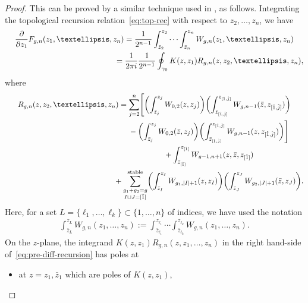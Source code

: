 \documentclass[11pt]{article}
\theoremstyle{definition}
\numberwithin{equation}{section}
\def\p{\partial}
\begin{document}
\begin{proof}
This can be proved by a similar technique used in
\cite[Theorem~4.7]{DM14}, as follows. Integrating
the topological recursion relation~\eqref{eq:top-rec}
with respect to $z_{2}, \dots, z_{n}$, we have
\begin{gather}
\frac{\p}{\p z_{1}} F_{g,n}(z_{1},\dots,z_{n})  =
\frac{1}{2^{n-1}}\int_{\bar{z}_{2}}^{z_{2}} \cdots
\int_{\bar{z}_{n}}^{z_{n}} W_{g,n}(z_{1},\dots,z_{n})\nonumber \\
\hphantom{\frac{\p}{\p z_{1}} F_{g,n}(z_{1},\dots,z_{n})}{}
=
\frac{1}{2\pi i} \frac{1}{2^{n-1}} \oint_{\gamma_{0}}
K(z,z_{1}) R_{g,n}(z,z_{2},\dots,z_{n}), \label{eq:pre-diff-recursion}
\end{gather}
where
\begin{gather*}
R_{g,n}(z,z_{2},\dots,z_{n}) =
\sum_{j=2}^{n}
\Biggl[ \biggl(\int^{z_{j}}_{\bar{z}_{j}}W_{0,2}(z,z_{j}) \biggr)
\biggl(\int^{z_{[\hat{1}, \hat{j}]}}_{\bar{z}_{[\hat{1}, \hat{j}]}}
W_{g,n-1}(\bar{z}, z_{[\hat{1},\hat{j}]}) \biggr)\\
\hphantom{R_{g,n}(z,z_{2},\dots,z_{n}) =}{}
- \biggl(\int^{z_{j}}_{\bar{z}_{j}}W_{0,2}(\bar{z},z_{j}) \biggr)
\biggl(\int^{z_{[\hat{1}, \hat{j}]}}_{\bar{z}_{[\hat{1}, \hat{j}]}}
W_{g,n-1}(z, z_{[\hat{1},\hat{j}]})
\biggr) \Biggr]
\\
\hphantom{R_{g,n}(z,z_{2},\dots,z_{n}) =}{}
+ \int^{z_{[\hat{1}]}}_{\bar{z}_{[\hat{1}]}}
W_{g-1,n+1}(z,\bar{z},z_{[\hat{1}]})\\
\hphantom{R_{g,n}(z,z_{2},\dots,z_{n}) =}{}
 + \sum_{\substack{g_{1}+g_{2}=g \\
 I \sqcup J = [\hat{1}]}}^{\text{stable}}
\biggl( \int^{z_{I}}_{\bar{z}_{I}}
W_{g_{1}, |I|+1}(z,z_{I}) \biggr)
\biggl( \int^{z_{J}}_{\bar{z}_{J}}
W_{g_{2}, |J|+1}(\bar{z}, z_{J})
\biggr).
\end{gather*}
Here, for a set $L =\{\ell_{1}, \dots, \ell_{k} \}
\subset \{1,\dots,n \}$ of indices, we have used the notation
\begin{gather*}
\int^{z_{L}}_{\bar{z}_{L}} W_{g,n}(z_{1},\dots,z_{n}) :=
\int^{z_{\ell_{1}}}_{\bar{z}_{\ell_{1}}} \cdots
\int^{z_{\ell_{k}}}_{\bar{z}_{\ell_{k}}} W_{g,n}(z_{1},\dots,z_{n}).
\end{gather*}
On the $z$-plane, the integrand
$K(z,z_{1})R_{g,n}(z,z_{1},\dots,z_{n})$
in the right hand-side of~\eqref{eq:pre-diff-recursion}
has poles at
\begin{itemize}\itemsep=0pt
\item
at $z = z_{1}, \bar{z}_{1}$ which are poles of $K(z,z_{1})$,

\end{itemize}
\end{proof}
\end{document}
